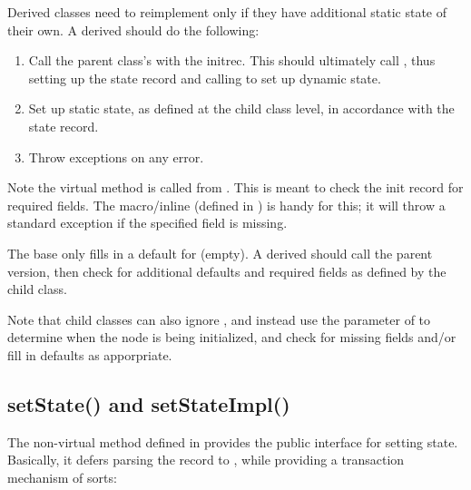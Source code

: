 \documentclass[10pt,twoside]{book}
\begin{document}
  Derived classes need to reimplement  only if they have additional
  static state of their own. A derived  should do the following:

  \begin{enumerate}
  
  \item Call the parent class's  with the initrec. This should
    ultimately call , thus setting up the state record  and
    calling  to set up dynamic state.

  \item Set up static state, as defined at the child class level, in accordance
    with the state record.

  \item Throw exceptions on any error. 

  \end{enumerate}
  
  Note the virtual  method is called from
  . This is meant to check the init record for required
  fields. The  macro/inline (defined in
  ) is handy for this; it will throw a standard exception if the
  specified field is missing. 
  
  The base  only fills in a default for 
  (empty). A derived  should call the parent version, then
  check for additional defaults and required fields as defined by the child
  class.
  
  Note that child classes can also ignore , and instead use
  the  parameter of  to determine when
  the node is being initialized, and check for missing fields and/or fill in
  defaults as apporpriate.

\subsection{setState() and setStateImpl()}

  The non-virtual  method defined in  provides the
  public interface for setting state. Basically, it defers parsing the record
  to , while providing a transaction mechanism of sorts:
\end{document}
